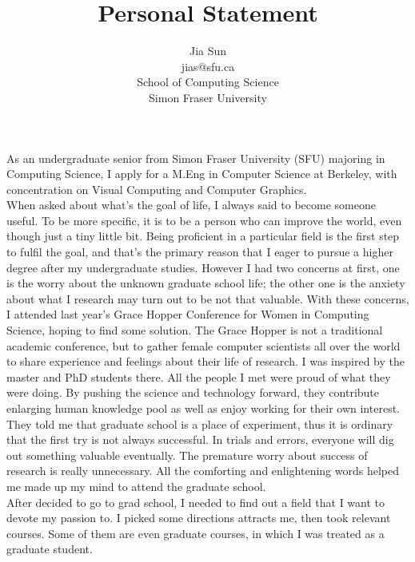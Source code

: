\documentclass{article}
\title{Personal Statement}
\author{Jia Sun\\jias@sfu.ca\\School of Computing Science\\Simon Fraser University}
\begin{document}
\maketitle%

As an undergraduate senior from Simon Fraser University (SFU) majoring in Computing Science, I apply for a M.Eng in Computer Science at Berkeley, with concentration on Visual Computing and Computer Graphics.\\


When asked about what's the goal of life, I always said to become someone useful. To be more specific, it is to be a person who can improve the world, even though just a tiny little bit. Being proficient in a particular field is the first step to fulfil the goal, and that's the primary reason that I eager to pursue a higher degree after my undergraduate studies. However I had two concerns at first, one is the worry about the unknown graduate school life; the other one is the anxiety about what I research may turn out to be not that valuable. With these concerns, I attended last year's Grace Hopper Conference for Women in Computing Science, hoping to find some solution. The Grace Hopper is not a traditional academic conference, but to gather female computer scientists all over the world to share experience and feelings about their life of research. I was inspired by the master and PhD students there. All the people I met were proud of what they were doing. By pushing the science and technology forward, they contribute enlarging human knowledge pool as well as enjoy working for their own interest. They told me that graduate school is a place of experiment, thus it is ordinary that the first try is not always successful. In trials and errors, everyone will dig out something valuable eventually. The premature worry about success of research is really unnecessary. All the comforting and enlightening words helped me made up my mind to attend the graduate school.  \\


After decided to go to grad school, I needed to find out a field that I want to devote my passion to. I picked some directions attracts me, then took relevant courses. Some of them are even graduate courses, in which I was treated as a graduate student.\\
\end{document}
